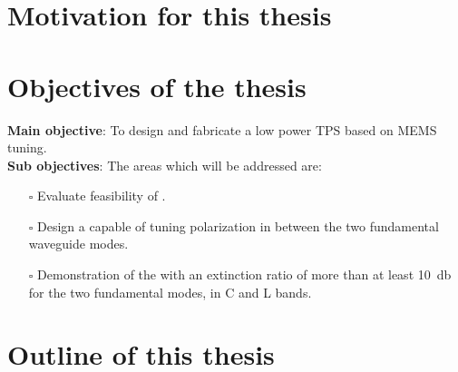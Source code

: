 \documentclass[../report.tex]{subfiles}
\begin{document}
	\section{Motivation for this thesis} 



	\section{Objectives of the thesis}
\textbf{Main objective}: To design and fabricate a low power TPS based on MEMS tuning. \\

\noindent \textbf{Sub objectives}: The areas which will be addressed are:
\begin{itemize}	
	\item[$\square$] Evaluate feasibility of . 
	\item[$\square$] Design a capable of tuning polarization in between the two fundamental waveguide modes.
	\item[$\square$] Demonstration of the  with an extinction ratio of more than at least \SI{10}{\decibel} for the two fundamental modes, in C and L bands.
\end{itemize}
	
	\section{Outline of this thesis}
	
\end{document}
